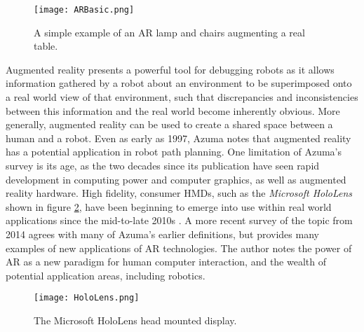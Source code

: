 \begin{figure}[h]
	\begin{center}
	\texttt{[image: ARBasic.png]}
	\decoRule
	\caption[Simple AR visualisation. \cite{Azuma:1997}]{A simple example of an AR lamp and chairs augmenting a real table. \cite{Azuma:1997}}
	\label{fig:ARBasic}
	\end{center}
\end{figure}

Augmented reality presents a powerful tool for debugging robots as it allows information gathered by a robot about an environment to be superimposed onto a real world view of that environment, such that discrepancies and inconsistencies between this information and the real world become inherently obvious. More generally, augmented reality can be used to create a shared space between a human and a robot. Even as early as 1997, Azuma \cite{Azuma:1997} notes that augmented reality has a potential application in robot path planning. One limitation of Azuma's survey is its age, as the two decades since its publication have seen rapid development in computing power and computer graphics, as well as augmented reality hardware. High fidelity, consumer HMDs, such as the \textit{Microsoft HoloLens} shown in figure \ref{fig:HoloLens}, have been beginning to emerge into use within real world applications since the mid-to-late 2010s \cite{HoloLens}. A more recent survey of the topic from 2014 \cite{Billinghurst:2014} agrees with many of Azuma's earlier definitions, but provides many examples of new applications of AR technologies. The author notes the power of AR as a new paradigm for human computer interaction, and the wealth of potential application areas, including robotics.

\begin{figure}
	\begin{center}
	\texttt{[image: HoloLens.png]}
	\decoRule
	\caption[Microsoft HoloLens. ]{The Microsoft HoloLens head mounted display.}
	\label{fig:HoloLens}
	\end{center}
\end{figure}

